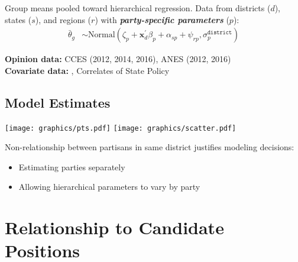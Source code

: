 \documentclass[a0]{a0poster}
\begin{document}
\begin{multicols*}{3}
Group means pooled toward hierarchical regression. Data from districts ($d$), states ($s$), and regions ($r$) with \emph{\textbf{party-specific parameters}} ($p$):
\begin{align}
  \bar{\theta}_{g} &\sim \mathrm{Normal}\left(\zeta_{p} + \mathbf{x}^{'}_{d}\beta_{p} + \alpha_{sp} + \psi_{rp}, \sigma^{\texttt{district}}_{p} \right) 
\end{align}



\textsf{\textbf{Opinion data:}} CCES (2012, 2014, 2016), ANES (2012, 2016) \\
\textsf{\textbf{Covariate data:}} \textcite{foster-molina:2016:data}, Correlates of State Policy


\subsection*{Model Estimates}

\begin{center}
  \texttt{[image: graphics/pts.pdf]}
  \texttt{[image: graphics/scatter.pdf]}
\end{center}


Non-relationship between partisans in same district justifies modeling decisions:
\begin{itemize}
  \item Estimating parties separately 
  \item Allowing hierarchical parameters to vary by party
\end{itemize}

\columnbreak

\section*{Relationship to Candidate Positions}


\end{multicols*}
\end{document}
